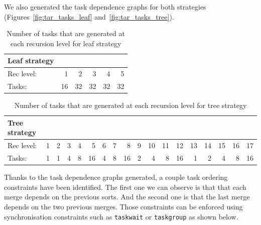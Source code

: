 We also generated the task dependence graphs for both strategies (Figures~\ref{fig:tar_tasks_leaf} and~\ref{fig:tar_tasks_tree}).
\begin{table}[H]
\centering
\begin{tabular}{lrrrrr}
\toprule
Leaf strategy & & & & & \\
\midrule
Rec level:        & 1     & 2     & 3     & 4     & 5  \\
Tasks:    & 16    & 32    & 32    & 32    & 32 \\
\bottomrule
\end{tabular}

\caption{Number of tasks that are generated at each recursion level for leaf strategy} 
\label{tab:leaf_tasks-rec_level}
\end{table}

\begin{table}[H]
\centering
\begin{tabular}{lrrrrrrrrrrrrrrrrr}
\toprule
Tree strategy & & & & & & & & & & & & & & & & &\\
\midrule
Rec level:        & 1     & 2     & 3     & 4     & 5     & 6     & 7     & 8     & 9     & 10    & 11    & 12    & 13    & 14    & 15    & 16    & 17  \\
Tasks:    & 1     & 1     & 4     & 8     & 16    & 4     & 8     & 16    & 2     & 4     & 8     & 16    & 1     & 2     & 4     & 8    & 16 \\
\bottomrule
\end{tabular}

\caption{Number of tasks that are generated at each recursion level for tree strategy} 
\label{tab:tree_tasks-rec_level}
\end{table}

Thanks to the task dependence graphs generated, a couple task ordering constraints have been identified. The first one we can observe is that that each merge depends on the previous sorts. And the second one is that the last merge depends on the two previous merges. Those constraints can be enforced using synchronisation constraints such as \texttt{taskwait} or \texttt{taskgroup} as shown below.


